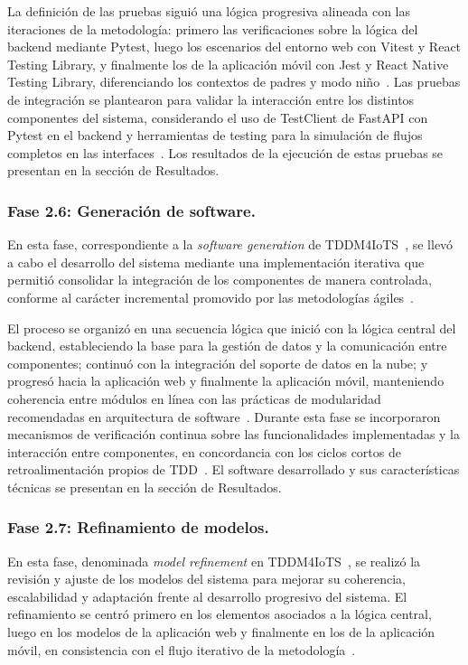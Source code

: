					La definición de las pruebas siguió una lógica progresiva alineada con las iteraciones de la metodología: primero las verificaciones sobre la lógica del backend mediante Pytest, luego los escenarios del entorno web con Vitest y React Testing Library, y finalmente los de la aplicación móvil con Jest y React Native Testing Library, diferenciando los contextos de padres y modo niño~\cite{GuerreroUlloa2024,Fowler2002}. Las pruebas de integración se plantearon para validar la interacción entre los distintos componentes del sistema, considerando el uso de TestClient de FastAPI con Pytest en el backend y herramientas de testing para la simulación de flujos completos en las interfaces~\cite{Fowler2002}. Los resultados de la ejecución de estas pruebas se presentan en la sección de Resultados.
					
				\subsubsection{Fase 2.6: Generación de software.}
					En esta fase, correspondiente a la \textit{software generation} de TDDM4IoTS~\cite{GuerreroUlloa2024}, se llevó a cabo el desarrollo del sistema mediante una implementación iterativa que permitió consolidar la integración de los componentes de manera controlada, conforme al carácter incremental promovido por las metodologías ágiles~\cite{Fowler2002}.
					
					El proceso se organizó en una secuencia lógica que inició con la lógica central del backend, estableciendo la base para la gestión de datos y la comunicación entre componentes; continuó con la integración del soporte de datos en la nube; y progresó hacia la aplicación web y finalmente la aplicación móvil, manteniendo coherencia entre módulos en línea con las prácticas de modularidad recomendadas en arquitectura de software~\cite{Fowler2002,Kleppmann2017}. Durante esta fase se incorporaron mecanismos de verificación continua sobre las funcionalidades implementadas y la interacción entre componentes, en concordancia con los ciclos cortos de retroalimentación propios de TDD~\cite{GuerreroUlloa2024,Fowler2002}. El software desarrollado y sus características técnicas se presentan en la sección de Resultados.
					
				\subsubsection{Fase 2.7: Refinamiento de modelos.}
					En esta fase, denominada \textit{model refinement} en TDDM4IoTS~\cite{GuerreroUlloa2024}, se realizó la revisión y ajuste de los modelos del sistema para mejorar su coherencia, escalabilidad y adaptación frente al desarrollo progresivo del sistema. El refinamiento se centró primero en los elementos asociados a la lógica central, luego en los modelos de la aplicación web y finalmente en los de la aplicación móvil, en consistencia con el flujo iterativo de la metodología~\cite{GuerreroUlloa2024}.
					
